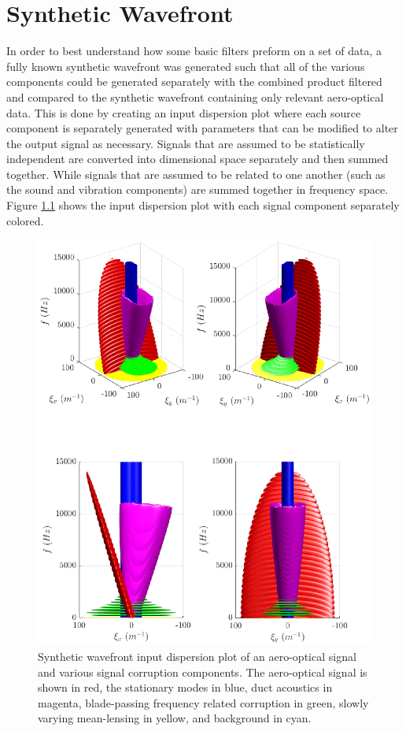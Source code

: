 
\chapter{Synthetic Wavefront}
In order to best understand how some basic filters preform on a set of data, a fully known synthetic wavefront was generated such that all of the various components could be generated separately with the combined product filtered and compared to the synthetic wavefront containing only relevant aero-optical data.
This is done by creating an input dispersion plot where each source component is separately generated with parameters that can be modified to alter the output signal as necessary.
Signals that are assumed to be statistically independent are converted into dimensional space separately and then summed together.
While signals that are assumed to be related to one another (such as the sound and vibration components) are summed together in frequency space.
Figure \ref{fig:05_synthetic_dispersion_input} shows the input dispersion plot with each signal component separately colored.
\begin{figure}
 \centering
 \includegraphics{../matlab/05_synthetic_wavefront/synthetic_wavefront.eps}
 \caption{Synthetic wavefront input dispersion plot of an aero-optical signal and various signal corruption components.  The aero-optical signal is shown in red, the stationary modes in blue, duct acoustics in magenta, blade-passing frequency related corruption in green, slowly varying mean-lensing in yellow, and background in cyan.}
 \label{fig:05_synthetic_dispersion_input}
\end{figure}
